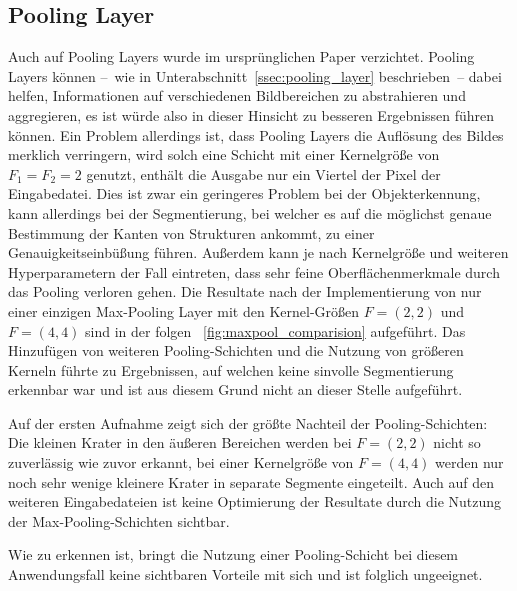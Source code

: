 \subsection{Pooling Layer}
\label{ssec:network_architecture_pooling}

Auch auf Pooling Layers wurde im ursprünglichen Paper verzichtet. Pooling Layers können --~wie in Unterabschnitt~\ref{ssec:pooling_layer} beschrieben~-- dabei helfen, Informationen auf verschiedenen Bildbereichen zu abstrahieren und aggregieren, es ist würde also in dieser Hinsicht zu besseren Ergebnissen führen können. Ein Problem allerdings ist, dass Pooling Layers die Auflösung des Bildes merklich verringern, wird solch eine Schicht \bspw mit einer Kernelgröße von $F_1=F_2=2$ genutzt, enthält die Ausgabe nur ein Viertel der Pixel der Eingabedatei. Dies ist zwar ein geringeres Problem bei der Objekterkennung, kann allerdings bei der Segmentierung, bei welcher es auf die möglichst genaue Bestimmung der Kanten von Strukturen ankommt, zu einer Genauigkeitseinbüßung führen. Außerdem kann je nach Kernelgröße und weiteren Hyperparametern der Fall eintreten, dass sehr feine Oberflächenmerkmale durch das Pooling verloren gehen. Die Resultate nach der Implementierung von nur einer einzigen Max-Pooling Layer mit den Kernel-Größen $F=(2, 2)$ und $F=(4, 4)$ sind in der folgen \figurename~\ref{fig:maxpool_comparision} aufgeführt. Das Hinzufügen von weiteren Pooling-Schichten und die Nutzung von größeren Kerneln führte zu Ergebnissen, auf welchen keine sinvolle Segmentierung erkennbar war und ist aus diesem Grund nicht an dieser Stelle aufgeführt.

Auf der ersten Aufnahme zeigt sich der größte Nachteil der Pooling-Schichten: Die kleinen Krater in den äußeren Bereichen werden bei $F=(2, 2)$ nicht so zuverlässig wie zuvor erkannt, bei einer Kernelgröße von $F=(4, 4)$ werden nur noch sehr wenige kleinere Krater in separate Segmente eingeteilt. Auch auf den weiteren Eingabedateien ist keine Optimierung der Resultate durch die Nutzung der Max-Pooling-Schichten sichtbar.

Wie zu erkennen ist, bringt die Nutzung einer Pooling-Schicht bei diesem Anwendungsfall keine sichtbaren Vorteile mit sich und ist folglich ungeeignet.

